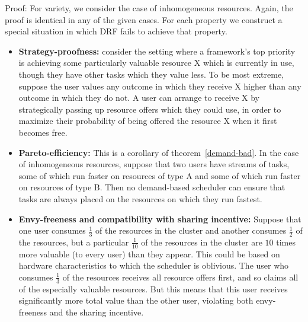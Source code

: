 \documentclass{acm_proc_article-sp}
\begin{document}
Proof: For variety, we consider the case of inhomogeneous resources. Again, the proof is identical in any of the given cases. For each property we construct a special situation in which DRF fails to achieve that property.

\begin{itemize}
\item \textbf{Strategy-proofness:} consider the setting where a framework's top priority is achieving some particularly valuable resource X 
which is currently in use, though they have other tasks which they value less. To be most extreme, suppose the user values any outcome in which they receive X 
higher than any outcome in which they do not. 
A user can arrange to receive X by strategically passing up resource offers which they could use, in order to maximize 
their probability of being offered the resource X when it first becomes free. 
\item \textbf{Pareto-efficiency:} This is a corollary of theorem~\ref{demand-bad}. 
In the case of inhomogeneous resources, suppose that two users have streams of tasks, some of which run faster on resources of type A and some of which run faster on resources of type B. 
Then no demand-based scheduler can ensure that tasks are always placed on the resources on which they run fastest.
\item \textbf{Envy-freeness and compatibility with sharing incentive:} Suppose that one user consumes $\frac 13$ of the resources in the cluster and another consumes $\frac 12$ of the resources, 
but a particular $\frac 1{10}$ of the resources in the cluster are $10$ times more valuable (to every user) than they appear. 
This could be based on hardware characteristics to which the scheduler is oblivious. 
The user who consumes $\frac 13$ of the resources receives all resource offers first, and so claims all of the especially valuable resources. 
But this means that this user receives significantly more total value than the other user, violating both envy-freeness and the sharing incentive. 
\end{itemize}
\end{document}
